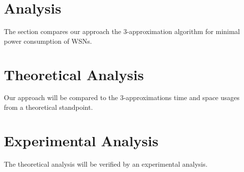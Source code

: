 \section{Analysis}
The section compares our approach the 3-approximation algorithm for minimal power consumption of WSNs.
\section{Theoretical Analysis}

Our approach will be compared to the 3-approximations time and space usages from a theoretical standpoint.

\section{Experimental Analysis}
The theoretical analysis will be verified by an experimental analysis.